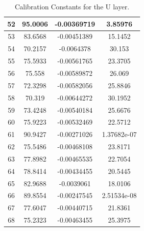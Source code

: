 \begin{table}[h]
{\begin{tabular}{|c|c|c|c|}
52 & 95.0006 & -0.00369719 & 3.85976 \\ \hline 
53 & 83.6568 & -0.00451389 & 15.1452 \\ \hline 
54 & 70.2157 & -0.0064378 & 30.153 \\ \hline 
55 & 75.5933 & -0.00561765 & 23.3705 \\ \hline 
56 & 75.558 & -0.00589872 & 26.069 \\ \hline 
57 & 72.3298 & -0.00582056 & 25.8846 \\ \hline 
58 & 70.319 & -0.00644272 & 30.1952 \\ \hline 
59 & 73.4248 & -0.00540184 & 25.6676 \\ \hline 
60 & 75.9223 & -0.00532469 & 22.5712 \\ \hline 
61 & 90.9427 & -0.00271026 & 1.37682e-07 \\ \hline 
62 & 75.5486 & -0.00468108 & 23.8171 \\ \hline 
63 & 77.8982 & -0.00465535 & 22.7054 \\ \hline 
64 & 78.8414 & -0.00434455 & 20.5445 \\ \hline 
65 & 82.9688 & -0.0039061 & 18.0106 \\ \hline 
66 & 89.8554 & -0.00247545 & 2.51534e-08 \\ \hline 
67 & 77.6047 & -0.00440715 & 21.8361 \\ \hline 
68 & 75.2323 & -0.00463455 & 25.3975 \\ \hline  
        \end{tabular}
        }
        \caption{Calibration Constants for the U layer.}
        \label{tab:UattenCSimulation}
\end{table}

